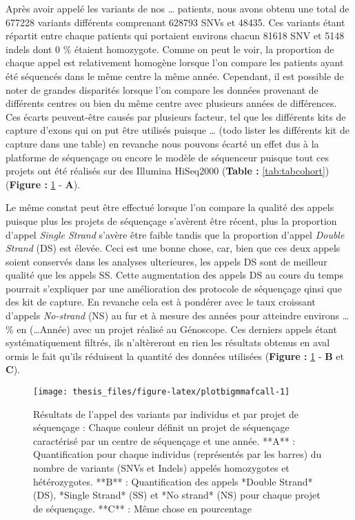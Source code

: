 \documentclass[12pt,twoside]{reedthesis}
\theoremstyle{definition}
\theoremstyle{definition}
\theoremstyle{remark}
\begin{document}
  Après avoir appelé les variants de nos \ldots{} patients, nous avons
  obtenu une total de 677228 variants différents comprenant 628793 SNVs et
  48435. Ces variants étant répartit entre chaque patients qui portaient
  environs chacun 81618 SNV et 5148 indels dont 0 \% étaient homozygote.
  Comme on peut le voir, la proportion de chaque appel est relativement
  homogène lorsque l'on compare les patients ayant été séquencés dans le
  même centre la même année. Cependant, il est possible de noter de
  grandes disparités lorsque l'on compare les données provenant de
  différents centres ou bien du même centre avec plusieurs années de
  différences. Ces écarts peuvent-être causés par plusieurs facteur, tel
  que les différents kits de capture d'exons qui on put être utilisés
  puisque \ldots{} (todo lister les différents kit de capture dans une
  table) en revanche nous pouvons écarté un effet dus à la platforme de
  séquençage ou encore le modèle de séquenceur puisque tout ces projets
  ont été réalisés sur des Illumina HiSeq2000 (\textbf{Table :
  }\ref{tab:tabcohort}) (\textbf{Figure : }\ref{fig:plotbigmmafcall} -
  \textbf{A}).
  
  Le même constat peut être effectué lorsque l'on compare la qualité des
  appels puisque plus les projets de séquençage s'avèrent être récent,
  plus la proportion d'appel \emph{Single Strand} s'avère être faible
  tandis que la proportion d'appel \emph{Double Strand} (DS) est élevée.
  Ceci est une bonne chose, car, bien que ces deux appels soient conservés
  dans les analyses ulterieures, les appels DS sont de meilleur qualité
  que les appels SS. Cette augmentation des appels DS au cours du temps
  pourrait s'expliquer par une amélioration des protocole de séquençage
  qinsi que des kit de capture. En revanche cela est à pondérer avec le
  taux croissant d'appels \emph{No-strand} (NS) au fur et à mesure des
  années pour atteindre environs \ldots{} \% en (\ldots{}Année) avec un
  projet réalisé au Génoscope. Ces derniers appels étant systématiquement
  filtrés, ils n'altèreront en rien les résultats obtenus en aval ormis le
  fait qu'ils réduisent la quantité des données utilisées (\textbf{Figure
  : }\ref{fig:plotbigmmafcall} - \textbf{B} et \textbf{C}).
  
  \newpage
  
  \begin{figure}
  
  {\centering \texttt{[image: thesis\_files/figure-latex/plotbigmmafcall-1]} 
  
  }
  
  \caption[Résultats de l'appel des variants par individus et par projet de séquençage]{Résultats de l'appel des variants par individus et par projet de séquençage : Chaque couleur définit un projet de séquençage caractérisé par un centre de séquençage et une année. **A** : Quantification pour chaque individus (représentés par les barres) du nombre de variants (SNVs et Indels) appelés homozygotes et hétérozygotes. **B** : Quantification des appels *Double Strand* (DS), *Single Strand* (SS) et *No strand* (NS) pour chaque projet de séquençage. **C** : Même chose en pourcentage}\label{fig:plotbigmmafcall}
  \end{figure}
  
\end{document}
